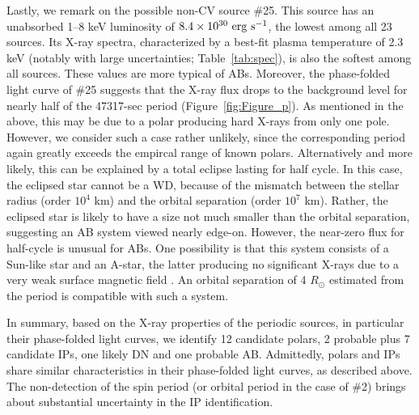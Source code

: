 \documentclass[fleqn,usenatbib]{mnras}
\begin{document}
Lastly, we remark on the possible non-CV source \#25. This source has an unabsorbed 1--8 keV luminosity of $\rm 8.4 \times 10^{30}~erg~s^{-1}$, the lowest among all 23 sources. Its X-ray spectra, characterized by a best-fit plasma temperature of 2.3 keV (notably with large uncertainties; Table~\ref{tab:spec}), is also the softest among all sources.
These values are more typical of ABs. 
Moreover, the phase-folded light curve of \#25 suggests that the X-ray flux drops to the background level for nearly half of the 47317-sec period (Figure~\ref{fig:Figure_p}). 
As mentioned in the above, this may be due to a polar producing hard X-rays from only one pole.
However, we consider such a case rather unlikely, since the corresponding period again greatly exceeds the empircal range of known polars.
Alternatively and more likely, this can be explained by a total eclipse lasting for half cycle.
In this case, the eclipsed star cannot be a WD, because of the mismatch between the stellar radius (order $10^4$ km)
and the orbital separation (order $10^7$ km).
Rather, the eclipsed star is likely to have a size not much smaller than the orbital separation, suggesting an AB system viewed nearly edge-on.
However, the near-zero flux for half-cycle is unusual for ABs. One possibility is that this system consists of a Sun-like star and an A-star, the latter producing no significant X-rays due to a very weak surface magnetic field \citep{2004A&ARv..12...71G}. 
An orbital separation of 4 $R_\odot$ estimated from the period is compatible with such a system. 

In summary, based on the X-ray properties of the periodic sources, in particular their phase-folded light curves, we identify 12 candidate polars, 2 probable plus 7 candidate IPs, one likely DN and one probable AB. 
Admittedly, polars and IPs share similar characteristics in their phase-folded light curves, as described above. The non-detection of the spin period (or orbital period in the case of \#2) brings about substantial uncertainty in the IP identification.
\end{document}

